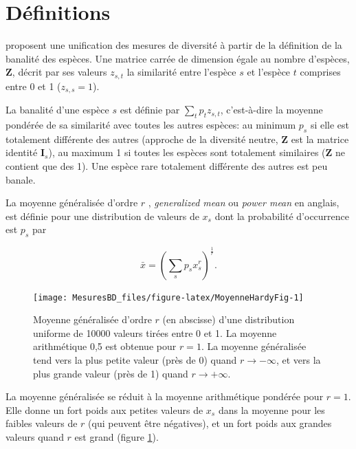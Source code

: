 \documentclass[
  11pt,
  french,
  a4paper,
  extrafontsizes,onecolumn,openright
  ]{memoir}
\begin{document}
\hypertarget{duxe9finitions}{%
\section{Définitions}\label{duxe9finitions}}

\textcite{Leinster2012} proposent une unification des mesures de diversité à partir de la définition de la banalité des espèces.
Une matrice carrée de dimension égale au nombre d'espèces, \(\mathbf{Z}\), décrit par ses valeurs \(z_{s,t}\) la similarité entre l'espèce \(s\) et l'espèce \(t\) comprises entre 0 et 1 (\(z_{s,s}=1\)).

La banalité d'une espèce \(s\) est définie par \(\sum_t{p_t z_{s,t}}\), c'est-à-dire la moyenne pondérée de sa similarité avec toutes les autres espèces: au minimum \(p_s\) si elle est totalement différente des autres (approche de la diversité neutre, \(\mathbf{Z}\) est la matrice identité \(\mathbf{I}_s\)), au maximum 1 si toutes les espèces sont totalement similaires (\(\mathbf{Z}\) ne contient que des 1).
Une espèce rare totalement différente des autres est peu banale.

La moyenne généralisée d'ordre \(r\) \autocite{Hardy1952}, \emph{generalized mean} ou \emph{power mean} en anglais, est définie pour une distribution de valeurs de \(x_s\) dont la probabilité d'occurrence est \(p_s\) par

\begin{equation}
  \label{eq:Hardy1952}
  \bar{x}={\left(\sum_s{p_s x^r_s}\right)}^{\frac{1}{r}}.
\end{equation}



\scriptsize

\begin{figure}

{\centering \texttt{[image: MesuresBD\_files/figure-latex/MoyenneHardyFig-1]} 

}

\caption{Moyenne généralisée d'ordre \(r\) (en abscisse) d'une distribution uniforme de 10000 valeurs tirées entre 0 et 1. La moyenne arithmétique 0,5 est obtenue pour \(r=1\). La moyenne généralisée tend vers la plus petite valeur (près de 0) quand \(r\to -\infty\), et vers la plus grande valeur (près de 1) quand \(r\to +\infty\).}\label{fig:MoyenneHardyFig}
\end{figure}

\normalsize

La moyenne généralisée se réduit à la moyenne arithmétique pondérée pour \(r=1\).
Elle donne un fort poids aux petites valeurs de \(x_s\) dans la moyenne pour les faibles valeurs de \(r\) (qui peuvent être négatives), et un fort poids aux grandes valeurs quand \(r\) est grand (figure \ref{fig:MoyenneHardyFig}).
\end{document}

